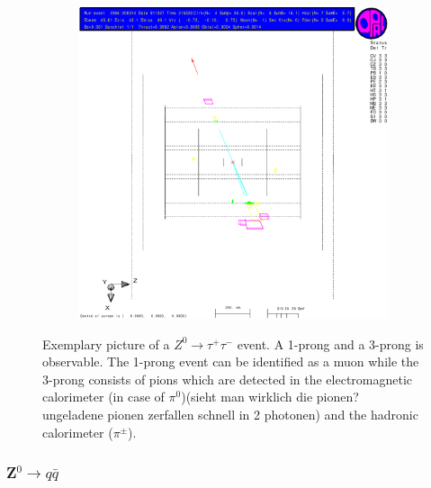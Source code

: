 \documentclass[11pt, a4paper]{article}
\numberwithin{equation}{section}
\newcommand{\korr}[1]{{\color{red}(#1)}}
\begin{document}
\begin{figure}[h]
	\ContinuedFloat
	\begin{subfigure}{\textwidth}
		\centering
		\includegraphics[width=.9\textwidth]{./data/tag1/tt_pics/cropped/tt_05_side}
	\end{subfigure}
	\caption{Exemplary picture of a $Z^0\rightarrow \tau^+\tau^-$ event. A 1-prong and a 3-prong is observable. The 1-prong event can be identified as a muon while the 3-prong consists of pions which are detected in the electromagnetic calorimeter (in case of $\pi^0$)\korr{sieht man wirklich die pionen? ungeladene pionen zerfallen schnell in 2 photonen} and the hadronic calorimeter ($\pi^\pm$).}
\end{figure}
\clearpage
\subsubsection{Z$^0\rightarrow q\bar{q}$}
\end{document}
